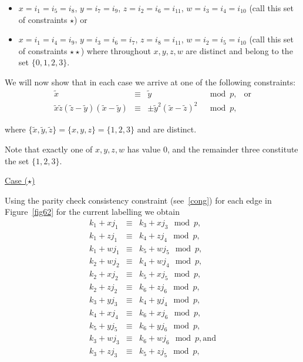 \begin{itemize}
\item $x=i_1=i_5=i_8$, $y=i_7=i_9$, $z=i_2=i_6=i_{11}$,
$w=i_3=i_4=i_{10}$ (call this set of constraints $\star$) or \item
$x=i_1=i_4=i_9$, $y=i_3=i_6=i_7$, $z=i_8=i_{11}$,
$w=i_2=i_5=i_{10}$ (call this set of constraints $\star\star$)
where throughout $x,y,z,w$ are distinct and belong to the set
$\{0,1,2,3\}$.
\end{itemize}

We will now show that in each case we arrive at one of the
following constraints:
\begin{equation}\label{consti}
\begin{array}{ccccc}
\tilde{x} &\equiv& \tilde{y} &\mod p, &\text{or} \\
\tilde{x}\tilde{z}(\tilde{z}-\tilde{y})(\tilde{x}-\tilde{y})
&\equiv& \pm \tilde{y}^2(\tilde{x}-\tilde{z})^2  &\mod p, &{}
\end{array}
\end{equation}

where $\{\tilde{x},\tilde{y},\tilde{z}\} = \{x,y,z\}= \{1,2,3\}$
and are distinct.

Note that exactly one of $x,y,z,w$ has value $0$, and the
remainder three constitute the set $\{1,2,3\}$.

\underline{Case ($\star$)}

Using the parity check consistency constraint (see~\eqref{cong})
for each edge in Figure~\ref{fig62} for the current labelling we
obtain
\begin{eqnarray}\label{ar62}
k_1+xj_1 &\equiv& k_3+xj_3 \mod p, \\
k_1+zj_1 &\equiv& k_4+zj_4 \mod p, \\
k_1+wj_1 &\equiv& k_5+wj_5 \mod p, \\
k_2+wj_2 &\equiv& k_4+wj_4 \mod p, \\
k_2+xj_2 &\equiv& k_5+xj_5 \mod p, \\
k_2+zj_2 &\equiv& k_6+zj_6 \mod p, \\
k_3+yj_3 &\equiv& k_4+yj_4 \mod p, \\
k_4+xj_4 &\equiv& k_6+xj_6 \mod p, \\
k_5+yj_5 &\equiv& k_6+yj_6 \mod p, \\
k_3+wj_3 &\equiv& k_6+wj_6 \mod p,\text{and} \\
k_3+zj_3 &\equiv& k_5+zj_5 \mod p,
\end{eqnarray}



